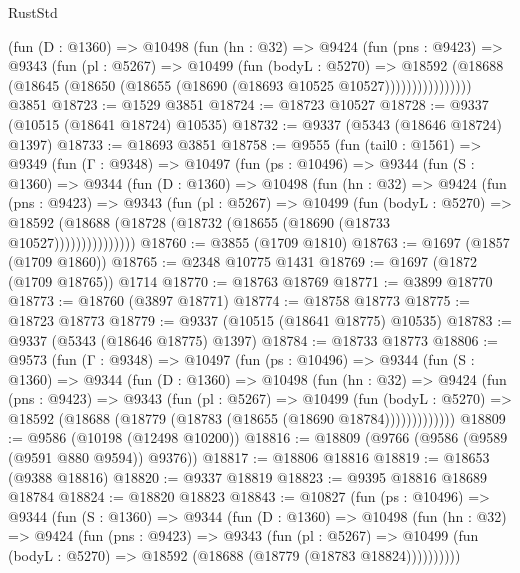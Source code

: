 \begin{lexlean}{RustStd}
\begin{coremodule}
              (fun (D : @1360) =>
              @10498
                (fun (hn : @32) =>
                @9424
                  (fun (pns : @9423) =>
                  @9343
                    (fun (pl : @5267) =>
                    @10499
                      (fun (bodyL : @5270) =>
                      @18592
                        (@18688
                          (@18645 (@18650 (@18655 (@18690 (@18693 @10525 @10527))))))))))))))))
    @3851
@18723 := @1529 @3851
@18724 := @18723 @10527
@18728 := @9337 (@10515 (@18641 @18724) @10535)
@18732 := @9337 (@5343 (@18646 @18724) @1397)
@18733 := @18693 @3851
@18758 := @9555
    (fun (tail0 : @1561) =>
    @9349
      (fun (Γ : @9348) =>
      @10497
        (fun (ps : @10496) =>
        @9344
          (fun (S : @1360) =>
          @9344
            (fun (D : @1360) =>
            @10498
              (fun (hn : @32) =>
              @9424
                (fun (pns : @9423) =>
                @9343
                  (fun (pl : @5267) =>
                  @10499
                    (fun (bodyL : @5270) =>
                    @18592 (@18688 (@18728 (@18732 (@18655 (@18690 (@18733 @10527)))))))))))))))
@18760 := @3855 (@1709 @1810)
@18763 := @1697 (@1857 (@1709 @1860))
@18765 := @2348 @10775 @1431
@18769 := @1697 (@1872 (@1709 @18765)) @1714
@18770 := @18763 @18769
@18771 := @3899 @18770
@18773 := @18760 (@3897 @18771)
@18774 := @18758 @18773
@18775 := @18723 @18773
@18779 := @9337 (@10515 (@18641 @18775) @10535)
@18783 := @9337 (@5343 (@18646 @18775) @1397)
@18784 := @18733 @18773
@18806 := @9573
    (fun (Γ : @9348) =>
    @10497
      (fun (ps : @10496) =>
      @9344
        (fun (S : @1360) =>
        @9344
          (fun (D : @1360) =>
          @10498
            (fun (hn : @32) =>
            @9424
              (fun (pns : @9423) =>
              @9343
                (fun (pl : @5267) =>
                @10499
                  (fun (bodyL : @5270) =>
                  @18592 (@18688 (@18779 (@18783 (@18655 (@18690 @18784)))))))))))))
@18809 := @9586 (@10198 (@12498 @10200))
@18816 := @18809 (@9766 (@9586 (@9589 (@9591 @880 @9594)) @9376))
@18817 := @18806 @18816
@18819 := @18653 (@9388 @18816)
@18820 := @9337 @18819
@18823 := @9395 @18816 @18689 @18784
@18824 := @18820 @18823
@18843 := @10827
    (fun (ps : @10496) =>
    @9344
      (fun (S : @1360) =>
      @9344
        (fun (D : @1360) =>
        @10498
          (fun (hn : @32) =>
          @9424
            (fun (pns : @9423) =>
            @9343
              (fun (pl : @5267) =>
              @10499 (fun (bodyL : @5270) => @18592 (@18688 (@18779 (@18783 @18824))))))))))

\end{coremodule}
\end{lexlean}
